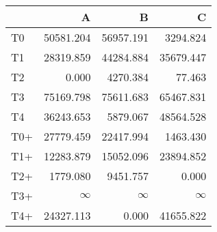 \begin{tabular}{lrrr}
\toprule
     &         A &         B &         C \\
\midrule
 T0  & \num{50581.204} & \num{56957.191} &  \num{3294.824} \\
 T1  & \num{28319.859} & \num{44284.884} & \num{35679.447} \\
 T2  &     \num{0.000} &  \num{4270.384} &    \num{77.463} \\
 T3  & \num{75169.798} & \num{75611.683} & \num{65467.831} \\
 T4  & \num{36243.653} &  \num{5879.067} & \num{48564.528} \\
 T0+ & \num{27779.459} & \num{22417.994} &  \num{1463.430} \\
 T1+ & \num{12283.879} & \num{15052.096} & \num{23894.852} \\
 T2+ &  \num{1779.080} &  \num{9451.757} &     \num{0.000} \\
 T3+ &  $\infty$    &  $\infty$    &  $\infty$    \\
 T4+ & \num{24327.113} &     \num{0.000} & \num{41655.822} \\
\bottomrule
\end{tabular}